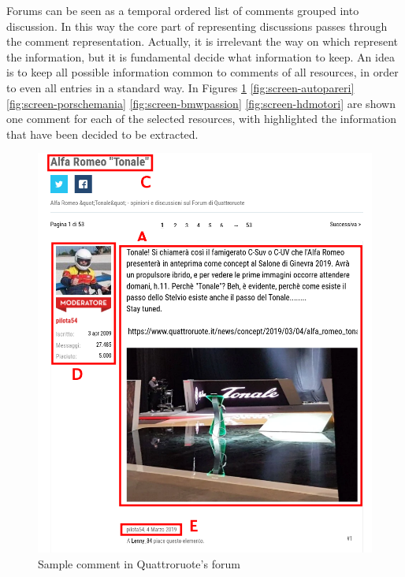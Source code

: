 Forums can be seen as a temporal ordered list of comments grouped into discussion. In this way the core part of representing discussions passes through the comment representation. Actually, it is irrelevant the way on which represent the information, but it is fundamental decide what information to keep. An idea is to keep all possible information common to comments of all resources, in order to even all entries in a standard way. In Figures \ref{fig:screen-quattroruote} \ref{fig:screen-autopareri} \ref{fig:screen-porschemania} \ref{fig:screen-bmwpassion} \ref{fig:screen-hdmotori} are shown one comment for each of the selected resources, with highlighted the information that have been decided to be extracted.

\begin{figure}[!hb]
	\centering
	\includegraphics[width=1\textwidth]{figures/screen/screen-quattroruote.png}
	\caption{Sample comment in Quattroruote's forum}
	\label{fig:screen-quattroruote}
\end{figure}


